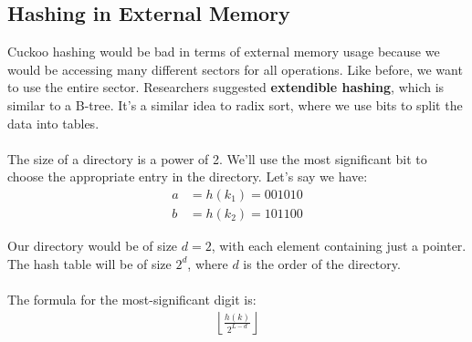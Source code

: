 \documentclass[]{article}
\theoremstyle{definition}
\begin{document}
		\subsection{Hashing in External Memory}
			Cuckoo hashing would be bad in terms of external memory usage because we would be accessing many different sectors for all operations. Like before, we want to use the entire sector. Researchers suggested \textbf{extendible hashing}, which is similar to a B-tree. It's a similar idea to radix sort, where we use bits to split the data into tables.
			\\ \\
			The size of a directory is a power of 2. We'll use the most significant bit to choose the appropriate entry in the directory. Let's say we have:
			\begin{align*}
				a &= h(k_1) = 001010 \\
				b &= h(k_2) = 101100
			\end{align*}

			Our directory would be of size $d = 2$, with each element containing just a pointer. The hash table will be of size $2^d$, where $d$ is the order of the directory.
			\\ \\
			The formula for the most-significant digit is:
			\begin{align*}
				\left \lfloor \frac{h(k)}{2^{L - d}} \right \rfloor
			\end{align*}
\end{document}
